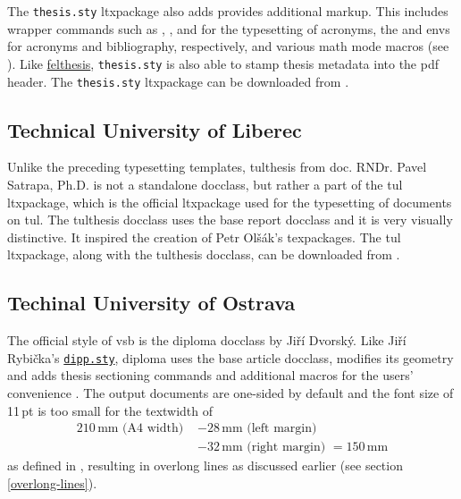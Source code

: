     The \texttt{thesis.sty} \gls{ltxpackage} also adds provides additional markup. This includes wrapper commands such as , ,  and  for the typesetting of acronyms, the  and  \glspl{env} for acronyms and bibliography, respectively, and various math mode macros (see \cite[p.~6--9]{thesis.sty-doc}). Like \hyperref[sec:felthesis]{felthesis}, \texttt{thesis.sty} is also able to stamp thesis metadata into the \gls{pdf} header. The \texttt{thesis.sty} \gls{ltxpackage} can be downloaded from \cite{thesis.sty}.

    \subsection{Technical University of Liberec}
    Unlike the preceding typesetting templates, tulthesis from doc. RNDr. Pavel Satrapa, Ph.D. is not a standalone \gls{docclass}, but rather a part of the tul \gls{ltxpackage}, which is the official \gls{ltxpackage} used for the typesetting of documents on \gls{tul}. The tulthesis \gls{docclass} uses the base report \gls{docclass} \cite[section~1]{tulthesis-man} and it is very visually distinctive. It inspired \cite[post~21]{ctustyle-forums} the creation of Petr Olšák's  \glspl{texpackage}. The tul \gls{ltxpackage}, along with the tulthesis \gls{docclass}, can be downloaded from \cite{tul}.

    \subsection{Techinal University of Ostrava}
    The official style of \gls{vsb} is the diploma \gls{docclass} by Jiří Dvorský. Like Jiří Rybička's \hyperref[sec:dipp.sty]{\tt dipp.sty}, diploma uses the base article \gls{docclass}, modifies its geometry and adds thesis sectioning commands and additional macros for the users' convenience \cite{diploma}. The output documents are one-sided by default and the font size of 11\,pt is too small for the \gls{textwidth} of \begin{equation}
      \begin{split}
        210\,\text{mm} \text{ (A4 width) } &- 28\,\text{mm} \text{ (left margin) }  \\
                                           &- 32\,\text{mm} \text{ (right margin) }
                                            = 150\,\text{mm}
      \end{split}
    \end{equation} as defined in \cite[lines~111,~123]{diplomaSource}, resulting in overlong lines as discussed earlier (see section \ref{overlong-lines}).

